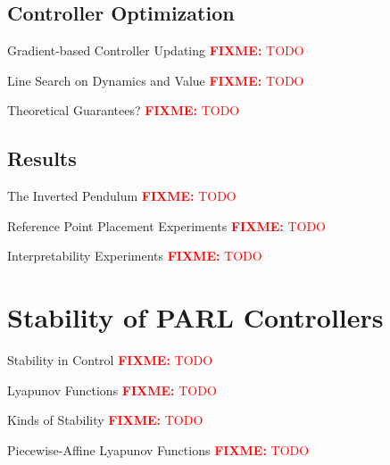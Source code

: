 \documentclass{beamer}
\newcommand\fixme[2][FIXME]{\textcolor{red}{\textbf{#1:} #2}}
\begin{document}
\subsection{Controller Optimization}

\begin{frame}{Gradient-based Controller Updating}
  \fixme{TODO}
\end{frame}

\begin{frame}{Line Search on Dynamics and Value}
  \fixme{TODO}
\end{frame}

\begin{frame}{Theoretical Guarantees?}
  \fixme{TODO}
\end{frame}


\subsection{Results}

\begin{frame}{The Inverted Pendulum}
  \fixme{TODO}
\end{frame}

\begin{frame}{Reference Point Placement Experiments}
  \fixme{TODO}
\end{frame}

\begin{frame}{Interpretability Experiments}
  \fixme{TODO}
\end{frame}

\section{Stability of PARL Controllers}

\begin{frame}{Stability in Control}
  \fixme{TODO}
\end{frame}

\begin{frame}{Lyapunov Functions}
  \fixme{TODO}
\end{frame}

\begin{frame}{Kinds of Stability}
  \fixme{TODO}
\end{frame}

\begin{frame}{Piecewise-Affine Lyapunov Functions}
  \fixme{TODO}
\end{frame}
\end{document}
